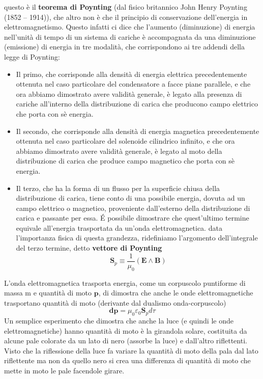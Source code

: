\documentclass[
10pt, %
a4paper, %
oneside, %
headinclude,footinclude, %
BCOR5mm, %
]{scrartcl}
\begin{document}
questo è il \textbf{teorema di Poynting} (dal fisico britannico John Henry Poynting (1852 – 1914)), che altro non è che il principio di conservazione dell'energia in elettromagnetismo. Questo infatti ci dice che l'aumento (diminuzione) di energia nell'unità di tempo di un sistema di cariche è accompagnata da una diminuzione (emissione) di energia in tre modalità, che corrispondono ai tre addendi della legge di Poynting:
\begin{itemize}
	\item Il primo, che corrisponde alla densità di energia elettrica precedentemente ottenuta nel caso particolare del condensatore a facce piane parallele, e che ora abbiamo dimostrato avere validità generale, è legato alla presenza di cariche all'interno della distribuzione di carica che producono campo elettrico che porta con sè energia. 
	\item Il secondo, che corrisponde alla densità di energia magnetica precedentemente ottenuta nel caso particolare del solenoide cilindrico infinito, e che ora abbiamo dimostrato avere validità generale, è legato al moto della distribuzione di carica che produce campo magnetico che porta con sè energia. 
	\item Il terzo, che ha la forma di un flusso per la superficie chiusa della distribuzione di carica, tiene conto di una possibile energia, dovuta ad un campo elettrico o magnetico, proveniente dall'esterno della distribuzione di carica e passante per essa. \'{E} possibile dimostrare che quest'ultimo termine equivale all'energia trasportata da un'onda elettromagnetica. data l'importanza fisica di questa grandezza, ridefiniamo l'argomento dell'integrale del terzo termine, detto \textbf{vettore di Poynting}
	\[\mathbf{S}_p \equiv \frac{1}{\mu_0}(\mathbf{E}\wedge\mathbf{B})\]
\end{itemize}
L'onda elettromagnetica trasporta energia, come un corpuscolo puntiforme di massa m e quantità di moto \(\mathbf{p}\), di dimostra che anche le onde elettromagnetiche trasportano quantità di moto (derivante dal dualismo onda-corpuscolo)
\[\mathbf{dp} = \mu_0\varepsilon_0 \mathbf{S}_p d\tau\]
Un semplice esperimento che dimostra che anche la luce (e quindi le onde elettromagnetiche) hanno quantità di moto è la girandola solare, costituita da alcune pale colorate da un lato di nero (assorbe la luce) e dall'altro riflettenti. Visto che la riflessione della luce fa variare la quantità di moto della pala dal lato riflettente ma non da quello nero si crea una differenza di quantità di moto che mette in moto le pale facendole girare. 
\newpage
\end{document}
